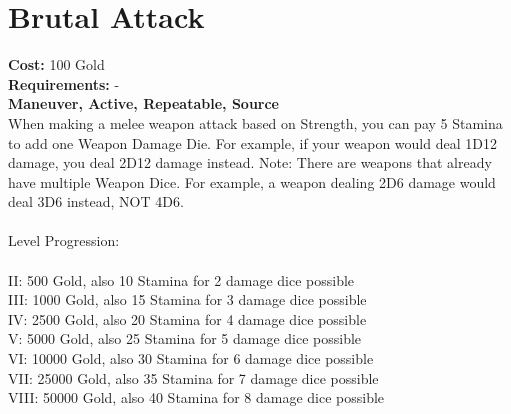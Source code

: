 \section{Brutal Attack}
\textbf{Cost:} 100 Gold\\
\textbf{Requirements:} -\\
\textbf{Maneuver, Active, Repeatable, Source}\\
When making a melee weapon attack based on Strength, you can pay 5 Stamina to add one Weapon Damage Die. For example, if your weapon would deal 1D12 damage, you deal 2D12 damage instead. Note: There are weapons that already have multiple Weapon Dice. For example, a weapon dealing 2D6 damage would deal 3D6 instead, NOT 4D6.\\
\\
Level Progression:\\
\\
II: 500 Gold, also 10 Stamina for 2 damage dice possible\\
III: 1000 Gold, also 15 Stamina for 3 damage dice possible\\
IV: 2500 Gold, also 20 Stamina for 4 damage dice possible\\
V: 5000 Gold, also 25 Stamina for 5 damage dice possible\\
VI: 10000 Gold, also 30 Stamina for 6 damage dice possible\\
VII: 25000 Gold, also 35 Stamina for 7 damage dice possible\\
VIII: 50000 Gold, also 40 Stamina for 8 damage dice possible\\